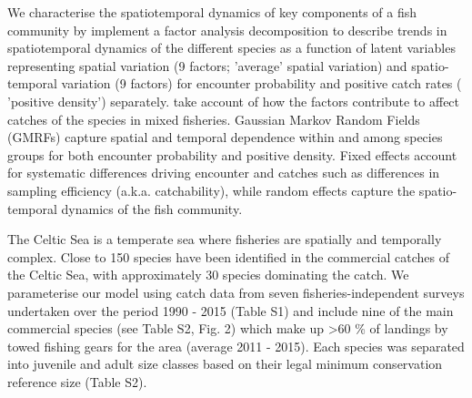 \documentclass[12pt]{article}
\begin{document}
\begin{linenumbers}
 We 
characterise the spatiotemporal dynamics of key components of a fish community
by implement a factor analysis decomposition
to describe trends in spatiotemporal dynamics of the different species as a
function of latent variables\cite{Thorson2015} representing spatial variation
(9 factors; 'average' spatial variation) and
spatio-temporal variation (9 factors) for encounter probability and positive
catch rates ( 'positive density')
separately\cite{Thorson2015a}.   take account of how the factors contribute to affect
catches of the species in mixed fisheries. Gaussian Markov
Random Fields (GMRFs) capture spatial and temporal dependence
within and among species groups for both encounter probability and positive
density\cite{Thorson2013}. Fixed effects account for
systematic differences driving encounter and catches\deleted{,} such as
differences in sampling efficiency (a.k.a. catchability), while random effects
capture the spatio-temporal dynamics of the fish community.

 The Celtic Sea is a temperate sea where fisheries are spatially
and temporally complex\cite{Ellis2000, Gerritsen2012}.
Close to 150 species have been identified in the commercial catches of the
Celtic Sea, with approximately 30 species dominating the catch\cite{Mateo2016}.
We parameterise our model using catch data from seven
fisheries-independent surveys undertaken over the
period 1990 - 2015 (Table S1) and include nine of the main
commercial species (see Table S2, Fig. 2)  which make up \textgreater 60 \% of landings by towed fishing
gears for the area (average 2011 - 2015\cite{STECF2017}). Each species was
separated into juvenile and adult size classes based on their legal minimum
conservation reference size (Table S2).


\end{linenumbers}
\end{document}
